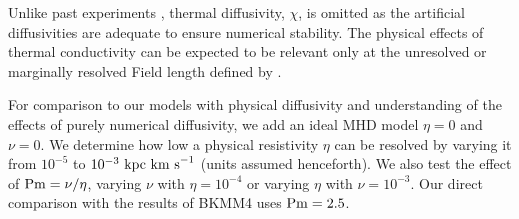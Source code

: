 \documentclass[preprint2]{aastex63}
\newcommand\Pm{{\rm Pm} }
\newcommand\kpc{~ {\rm kpc}}
\newcommand\dx{ {\delta x}}
\newcommand\kms{~ {\rm km~ s}^{-1}}
\newcommand\BKM{{\sf BKMM4}}
\newcommand{\fg}[1]{\textcolor{midgreen}{#1}}
\newcommand{\mm}[1]{\textcolor{mypurple}{#1}}
\newcommand{\fag}[1]{\textcolor{midblue}{FAG: #1}}
\begin{document}
 \fg{Unlike past} experiments \citep{Gent:2013a,Gent:2013b,GMKSH20},
 thermal diffusivity, $\chi$, \fg{is omitted as} the artificial diffusivities
 are adequate to ensure numerical stability.
 \fg{The} physical effects of thermal
 conductivity can be expected to be relevant only at the unresolved or
 marginally resolved Field length defined by \citet[][named after George
 Field, not the magnetic field]{BM90}.

 \mm{For comparison to our models with physical diffusivity and
   understanding of the effects of purely numerical diffusivity, we
   add an ideal MHD model}
 $\eta=0$ \fg{and $\nu=0$.}
 We determine how low a physical resistivity $\eta$ can be resolved by varying
 it from $10^{-5}$ to $10^{-3}\kpc\kms$ (units assumed henceforth).
 \fg{We also test the effect of $\Pm=\nu/\eta$, varying $\nu$ with 
 $\eta=10^{-4}$ or varying $\eta$ with $\nu=10^{-3}$.}
 Our direct comparison with the results of \fg{\BKM} uses $\Pm=2.5$.
 

\end{document}
